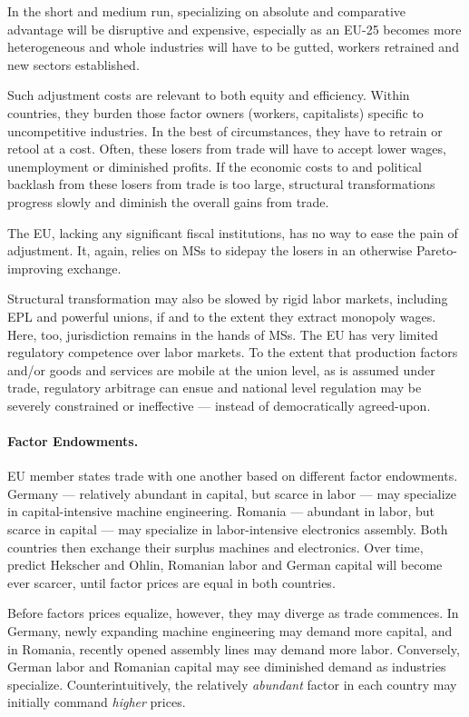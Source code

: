 \documentclass[11pt,a4paper,oneside]{article}
\begin{document}
In the short and medium run, specializing on absolute and comparative advantage will be disruptive and expensive, especially as an \gls{EU}-25 becomes more heterogeneous and whole industries will have to be gutted, workers retrained and new sectors established. 

Such adjustment costs are relevant to both equity and efficiency. Within countries, they burden those factor owners (workers, capitalists) specific to uncompetitive industries. 
In the best of circumstances, they have to retrain or retool at a cost. 
Often, these losers from trade will have to accept lower wages, unemployment or diminished profits. 
If the economic costs to and political backlash from these losers from trade is too large, structural transformations progress slowly and diminish the overall gains from trade.

The \gls{EU}, lacking any significant fiscal institutions, has no way to ease the pain of adjustment. 
It, again, relies on \glspl{MS} to sidepay the losers in an otherwise Pareto-improving exchange. %

Structural transformation may also be slowed by rigid labor markets, including \gls{EPL} and powerful unions, if and to the extent they extract monopoly wages. 
Here, too, jurisdiction remains in the hands of \glspl{MS}. 
The \gls{EU} has very limited regulatory competence over labor markets. 
To the extent that production factors and/or goods and services are mobile at the union level, as is assumed under trade, regulatory arbitrage can ensue and national level regulation may be severely constrained or ineffective --- instead of democratically agreed-upon.

\paragraph{Factor Endowments.} 
\gls{EU} member states trade with one another based on different factor endowments. Germany --- relatively abundant in capital, but scarce in labor --- may specialize in capital-intensive machine engineering. 
Romania --- abundant in labor, but scarce in capital --- may specialize in labor-intensive electronics assembly. 
Both countries then exchange their surplus machines and electronics. 
Over time, predict Hekscher and Ohlin, Romanian labor and German capital will become ever scarcer, until factor prices are equal in both countries. %

Before factors prices equalize, however, they may diverge as trade commences. 
In Germany, newly expanding machine engineering may demand more capital, and in Romania, recently opened assembly lines may demand more labor. 
Conversely, German labor and Romanian capital may see diminished demand as industries specialize. 
Counterintuitively, the relatively \emph{abundant} factor in each country may initially command \emph{higher} prices. 
\end{document}
